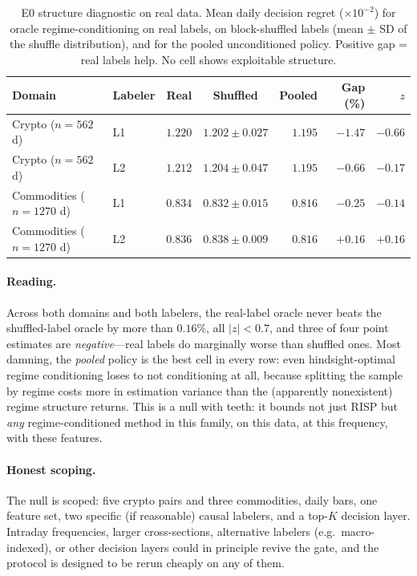 \documentclass[11pt,a4paper]{article}
\theoremstyle{definition}
\theoremstyle{plain}
\begin{document}
\begin{table}[h]
\centering
\caption{E0 structure diagnostic on real data. Mean daily decision regret
($\times 10^{-2}$) for oracle regime-conditioning on real labels, on
block-shuffled labels (mean $\pm$ SD of the shuffle distribution), and for
the pooled unconditioned policy. Positive gap = real labels help. No cell
shows exploitable structure.}
\label{tab:dd5-e0}
\small
\begin{tabular}{llccrrr}
\toprule
Domain & Labeler & Real & Shuffled & Pooled & Gap (\%) & $z$ \\
\midrule
Crypto ($n{=}562$ d) & L1 & $1.220$ & $1.202 \pm 0.027$ & $1.195$ & $-1.47$ & $-0.66$ \\
Crypto ($n{=}562$ d) & L2 & $1.212$ & $1.204 \pm 0.047$ & $1.195$ & $-0.66$ & $-0.17$ \\
Commodities ($n{=}1270$ d) & L1 & $0.834$ & $0.832 \pm 0.015$ & $0.816$ & $-0.25$ & $-0.14$ \\
Commodities ($n{=}1270$ d) & L2 & $0.836$ & $0.838 \pm 0.009$ & $0.816$ & $+0.16$ & $+0.16$ \\
\bottomrule
\end{tabular}
\end{table}

\paragraph{Reading.} Across both domains and both labelers, the real-label
oracle never beats the shuffled-label oracle by more than $0.16\%$, all
$|z| < 0.7$, and three of four point estimates are \emph{negative}---real
labels do marginally worse than shuffled ones. Most damning, the
\emph{pooled} policy is the best cell in every row: even hindsight-optimal
regime conditioning loses to not conditioning at all, because splitting the
sample by regime costs more in estimation variance than the (apparently
nonexistent) regime structure returns. This is a null with teeth: it bounds
not just RISP but \emph{any} regime-conditioned method in this family,
on this data, at this frequency, with these features.

\paragraph{Honest scoping.} The null is scoped: five crypto pairs and three
commodities, daily bars, one feature set, two specific (if reasonable)
causal labelers, and a top-$K$ decision layer. Intraday frequencies, larger
cross-sections, alternative labelers (e.g.\ macro-indexed), or other
decision layers could in principle revive the gate, and the protocol is
designed to be rerun cheaply on any of them.
\end{document}

